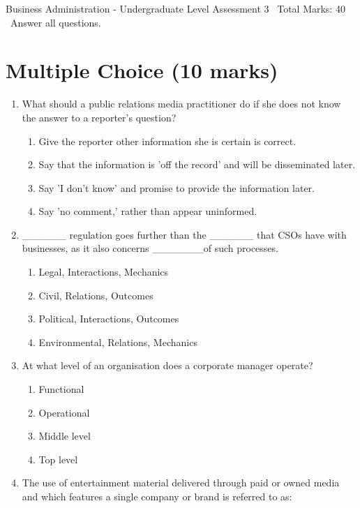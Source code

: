 \documentclass[12pt]{article}
\begin{document}
\begin{center}
Business Administration - Undergraduate Level Assessment 3 \
Total Marks: 40 \
Answer all questions.
\end{center}

\section*{Multiple Choice (10 marks)}
\begin{enumerate}[label=\arabic*.]
\item What should a public relations media practitioner do if she does not know the answer to a reporter's question?
\begin{enumerate}[label=(\alph*)]
    \item Give the reporter other information she is certain is correct.
    \item Say that the information is 'off the record' and will be disseminated later.
    \item Say 'I don't know' and promise to provide the information later.
    \item Say 'no comment,' rather than appear uninformed.
\end{enumerate}
\item \_\_\_\_\_\_ regulation goes further than the \_\_\_\_\_\_ that CSOs have with businesses, as it also concerns \_\_\_\_\_\_\_of such processes.
\begin{enumerate}[label=(\alph*)]
    \item Legal, Interactions, Mechanics
    \item Civil, Relations, Outcomes
    \item Political, Interactions, Outcomes
    \item Environmental, Relations, Mechanics
\end{enumerate}
\item At what level of an organisation does a corporate manager operate?
\begin{enumerate}[label=(\alph*)]
    \item Functional
    \item Operational
    \item Middle level
    \item Top level
\end{enumerate}
\item The use of entertainment material delivered through paid or owned media and which features a single company or brand is referred to as:
\begin{enumerate}[label=(\alph*)]

\end{enumerate}
\end{enumerate}
\end{document}
